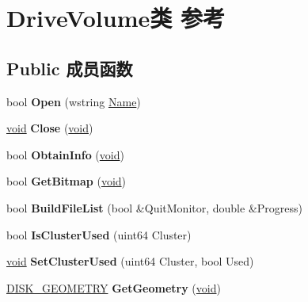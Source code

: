 \hypertarget{class_drive_volume}{}\section{Drive\+Volume类 参考}
\label{class_drive_volume}
\subsection*{Public 成员函数}
\begin{DoxyCompactItemize}
\item 
\mbox{\label{class_drive_volume_a3d0fcb43ece1e681649c3d2e1dedc2c8}} 
bool {\bfseries Open} (wstring \hyperlink{struct_name_rec__}{Name})
\item 
\mbox{\label{class_drive_volume_a287792b83a18e4ff27d50c118acfb72e}} 
\hyperlink{interfacevoid}{void} {\bfseries Close} (\hyperlink{interfacevoid}{void})
\item 
\mbox{\label{class_drive_volume_ac612b87c373a2f30658c9ae330808eeb}} 
bool {\bfseries Obtain\+Info} (\hyperlink{interfacevoid}{void})
\item 
\mbox{\label{class_drive_volume_a8cdaf43bb32a564615c84eaa40a97e9f}} 
bool {\bfseries Get\+Bitmap} (\hyperlink{interfacevoid}{void})
\item 
\mbox{\label{class_drive_volume_a4eaa9fbd3a1d38d2e1a35894b5c58eb8}} 
bool {\bfseries Build\+File\+List} (bool \&Quit\+Monitor, double \&Progress)
\item 
\mbox{\label{class_drive_volume_a3812b6d98ef1331427f7251c8e26bb43}} 
bool {\bfseries Is\+Cluster\+Used} (uint64 Cluster)
\item 
\mbox{\label{class_drive_volume_af1cf78f0d698f78d9896aa32fdeed4cc}} 
\hyperlink{interfacevoid}{void} {\bfseries Set\+Cluster\+Used} (uint64 Cluster, bool Used)
\item 
\mbox{\label{class_drive_volume_a348d14a90f7da4262518af947110db06}} 
\hyperlink{struct___d_i_s_k___g_e_o_m_e_t_r_y}{D\+I\+S\+K\+\_\+\+G\+E\+O\+M\+E\+T\+RY} {\bfseries Get\+Geometry} (\hyperlink{interfacevoid}{void})

\end{DoxyCompactItemize}
